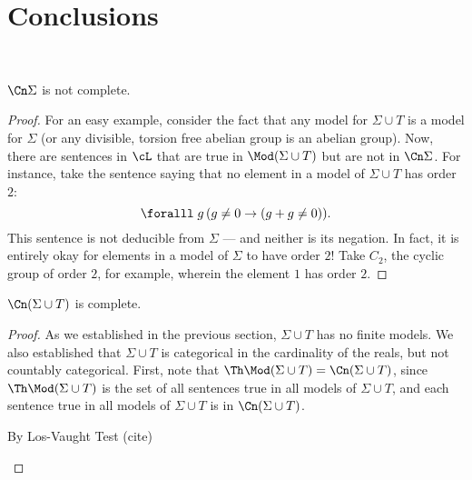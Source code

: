 \newpage
\section{Conclusions}~\label{sec:conclusions}

\begin{claim}
  $\Cn \Sigma$ is not complete.

  \begin{proof}
    For an easy example, consider the fact that any model for $\Sigma \cup T$
    is a model for $\Sigma$ (or any divisible, torsion free abelian group is an abelian group).
    Now, there are sentences in $\cL$ that are true in $\Mod (\Sigma \cup T)$
    but are not in $\Cn \Sigma$. For instance, take the sentence saying that
    no element in a model of $\Sigma \cup T$ has order $2$:
    \[ \forall g\, (g \neq 0 \lto (g + g \neq 0)). \]
    This sentence is not deducible from $\Sigma$ --- and neither
    is its negation. In fact, it is entirely okay for elements in a model of $\Sigma$
    to have order $2$! Take $C_2$, the cyclic group of order $2$,
    for example, wherein the element $1$ has order $2$.
  \end{proof}

\end{claim}

\begin{claim}
  $\Cn (\Sigma \cup T)$ is complete.

  \begin{proof}
    As we established in the previous section, $\Sigma \cup T$ has no finite models.
    We also established that $\Sigma \cup T$ is categorical in the cardinality of the
    reals, but not countably categorical.
    First, note that $\Th \Mod (\Sigma \cup T) = \Cn (\Sigma \cup T)$,
    since $\Th \Mod (\Sigma \cup T)$ is the set of all sentences true in all models
    of $\Sigma \cup T$, and each sentence true in all models of $\Sigma \cup T$
    is in $\Cn (\Sigma \cup T)$.

    \step
    By Los-Vaught Test (cite)
    \begin{quotation}
    \end{quotation}
  \end{proof}
\end{claim}

